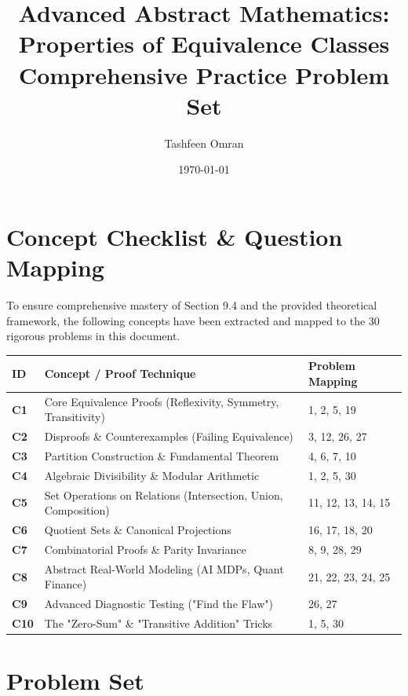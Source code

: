 \documentclass[11pt, a4paper]{article}
\theoremstyle{definition}
\theoremstyle{remark}
\begin{document}
\title{Advanced Abstract Mathematics: Properties of Equivalence Classes \\ \large Comprehensive Practice Problem Set}
\author{Tashfeen Omran}
\date{\today}
\maketitle

\tableofcontents
\newpage

\section{Concept Checklist \& Question Mapping}
\label{sec:checklist_start}

To ensure comprehensive mastery of Section 9.4 and the provided theoretical framework, the following concepts have been extracted and mapped to the 30 rigorous problems in this document.

\renewcommand{\arraystretch}{1.5}
\noindent
\begin{tabularx}{\textwidth}{>{\bfseries}l X l}
\toprule
ID & Concept / Proof Technique & Problem Mapping \\
\midrule
C1 & Core Equivalence Proofs (Reflexivity, Symmetry, Transitivity) & 1, 2, 5, 19 \\
C2 & Disproofs \& Counterexamples (Failing Equivalence) & 3, 12, 26, 27 \\
C3 & Partition Construction \& Fundamental Theorem & 4, 6, 7, 10 \\
C4 & Algebraic Divisibility \& Modular Arithmetic & 1, 2, 5, 30 \\
C5 & Set Operations on Relations (Intersection, Union, Composition) & 11, 12, 13, 14, 15 \\
C6 & Quotient Sets \& Canonical Projections & 16, 17, 18, 20 \\
C7 & Combinatorial Proofs \& Parity Invariance & 8, 9, 28, 29 \\
C8 & Abstract Real-World Modeling (AI MDPs, Quant Finance) & 21, 22, 23, 24, 25 \\
C9 & Advanced Diagnostic Testing ("Find the Flaw") & 26, 27 \\
C10 & The "Zero-Sum" \& "Transitive Addition" Tricks & 1, 5, 30 \\
\bottomrule
\end{tabularx}
\vspace{1em}

\newpage

\section{Problem Set}
\label{sec:problems}
\end{document}
